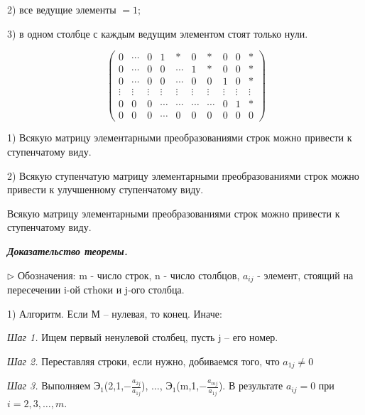 2) все ведущие элементы $ = 1$;

3) в одном столбце с каждым ведущим элементом стоят только нули.

\begin{equation*}
	\begin{pmatrix}
    	0 & \cdots & 0 & 1 & * & 0 & * & 0 & 0 & * \\
        0 & \cdots & 0 & 0 & \cdots & 1 & * & 0 & 0 & * \\
        0 & \cdots & 0 & 0 & \cdots & 0 & 0 & 1 & 0 & * \\
        \vdots & \vdots & \vdots& \vdots & \vdots & \vdots & \vdots & \vdots & \vdots& \vdots \\
        0 & 0 & 0 & \cdots & \cdots & \cdots & \cdots & 0 & 1 & *\\
        0 & 0 & 0 & \cdots & 0 & 0 & 0 & 0 & 0 & 0
	\end{pmatrix}
\end{equation*}

\begin{theorem}[]\label{theorem1}
	1) Всякую матрицу элементарными преобразованиями строк можно привести к ступенчатому виду.

2) Всякую ступенчатую матрицу элементарными преобразованиями строк можно привести к улучшенному ступенчатому виду.
\end{theorem}

\begin{corollary}
	Всякую матрицу элементарными преобразованиями строк можно привести к ступенчатому виду.
\end{corollary}

\begin{comment}
	Улучшенный ступенчатый вид матрицы определен однозначно.
\end{comment}

\textbf{\textit{Доказательство теоремы.}} 

$\rhd$ Обозначения: m - число строк, n - число столбцов, $a_{ij}$ - элемент, стоящий на пересечении i-ой стhоки и j-ого столбца.

\vspace{\baselineskip}
1) Алгоритм. Если М -- нулевая, то конец. Иначе:

\textit{Шаг 1.} Ищем первый ненулевой столбец, пусть j -- его номер.

\textit{Шаг 2.} Переставляя строки, если нужно, добиваемся того, что $a_{1j} \neq 0 $

\textit{Шаг 3.} Выполняем $Э_1$(2,1,$-\frac{a_{2j}}{a_{1j}}$), $\dots$, $Э_1$(m,1,$-\frac{a_{mj}}{a_{1j}}$). В результате $a_{ij} = 0$ при $i = 2,3, \dots, m$. 

